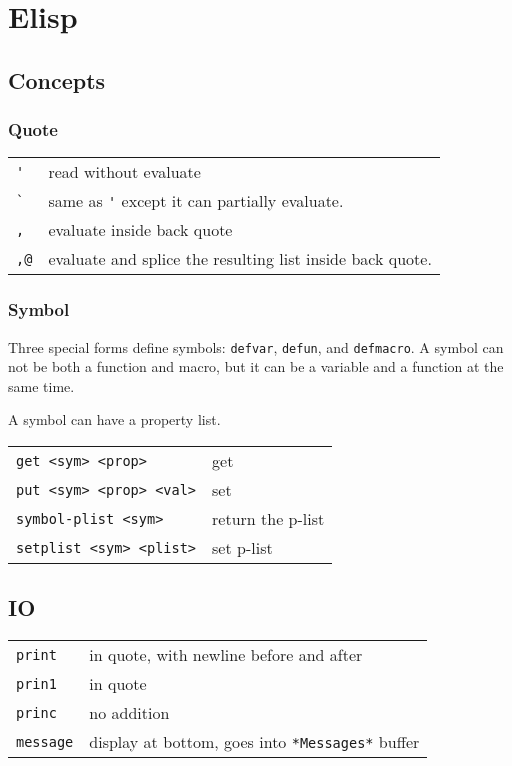 \section{Elisp}
\subsection{Concepts}

\subsubsection{Quote}
\begin{tabular}{@{}ll@{}}
  \lstinline!'! & read without evaluate \\
  \lstinline!`! & same as \lstinline!'! except it can partially evaluate.\\
  \lstinline!,! & evaluate inside back quote\\
  \lstinline!,@! & evaluate and splice the resulting list inside back quote.
\end{tabular}

\subsubsection{Symbol}
Three special forms define symbols: \texttt{defvar}, \texttt{defun}, and \texttt{defmacro}.
A symbol can not be both a function and macro, but it can be a variable and a function at the same time.

A symbol can have a property list.

\begin{tabular}{@{}ll@{}}
  \texttt{get <sym> <prop>} & get\\
  \texttt{put <sym> <prop> <val>} & set\\
  \texttt{symbol-plist <sym>} & return the p-list\\
  \texttt{setplist <sym> <plist>} & set p-list
\end{tabular}


\subsection{IO}
\begin{tabular}{@{}ll@{}}
  \texttt{print} & in quote, with newline before and after\\
  \texttt{prin1} & in quote\\
  \texttt{princ} & no addition\\
  \texttt{message} & display at bottom, goes into \lstinline!*Messages*! buffer
\end{tabular}


